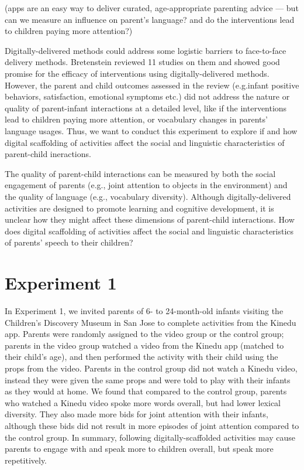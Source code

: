 \documentclass[10pt, letterpaper]{article}
\begin{document}
(apps are an easy way to deliver curated, age-appropriate parenting
advice --- but can we measure an influence on parent's language? and do
the interventions lead to children paying more attention?)

Digitally-delivered methods could address some logistic barriers to
face-to-face delivery methods. Bretenstein reviewed 11 studies on them
and showed good promise for the efficacy of interventions using
digitally-delivered methods. However, the parent and child outcomes
assessed in the review (e.g.infant positive behaviors, satisfaction,
emotional symptoms etc.) did not address the nature or quality of
parent-infant interactions at a detailed level, like if the
interventions lead to children paying more attention, or vocabulary
changes in parents' language usages. Thus, we want to conduct this
experiment to explore if and how digital scaffolding of activities
affect the social and linguistic characteristics of parent-child
ineractions.

The quality of parent-child interactions can be measured by both the
social engagement of parents (e.g., joint attention to objects in the
environment) and the quality of language (e.g., vocabulary diversity).
Although digitally-delivered activities are designed to promote learning
and cognitive development, it is unclear how they might affect these
dimensions of parent-child interactions. How does digital scaffolding of
activities affect the social and linguistic characteristics of parents'
speech to their children?

\section{Experiment 1}\label{experiment-1}

In Experiment 1, we invited parents of 6- to 24-month-old infants
visiting the Children's Discovery Museum in San Jose to complete
activities from the Kinedu app. Parents were randomly assigned to the
video group or the control group; parents in the video group watched a
video from the Kinedu app (matched to their child's age), and then
performed the activity with their child using the props from the video.
Parents in the control group did not watch a Kinedu video, instead they
were given the same props and were told to play with their infants as
they would at home. We found that compared to the control group, parents
who watched a Kinedu video spoke more words overall, but had lower
lexical diversity. They also made more bids for joint attention with
their infants, although these bids did not result in more episodes of
joint attention compared to the control group. In summary, following
digitally-scaffolded activities may cause parents to engage with and
speak more to children overall, but speak more repetitively.
\end{document}
